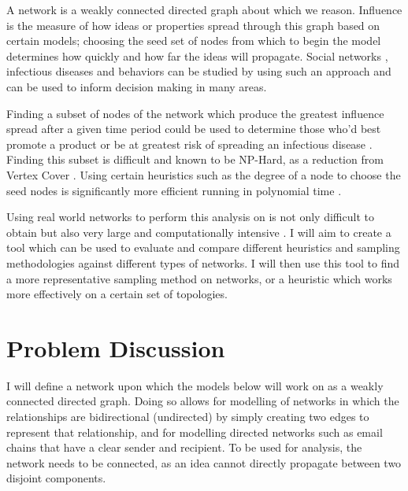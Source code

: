 \documentclass{article}
\begin{document}
A network is a weakly connected directed graph about which we reason.
Influence is the measure of how ideas or properties spread through this graph based on certain models;
choosing the seed set of nodes from which to begin the model determines how quickly and how far the ideas will propagate.
Social networks \cite{yang2019influence}, infectious diseases and behaviors \cite{archbold2024cvd} can be studied by using such an approach and can be used to inform decision making in many areas.

Finding a subset of nodes of the network which produce the greatest influence spread after a given time period could be used to determine those who'd best promote a product or be at greatest risk of spreading an infectious disease \cite{archbold2024cvd}.
Finding this subset is difficult and known to be NP-Hard, as a reduction from Vertex Cover \cite{kempe2005influential}.
Using certain heuristics such as the degree of a node to choose the seed nodes is significantly more efficient running in polynomial time \cite{chen2009efficient}.

Using real world networks to perform this analysis on is not only difficult to obtain but also very large and computationally intensive \cite{Wang2011UnderstandingGS}.
I will aim to create a tool which can be used to evaluate and compare different heuristics and sampling methodologies against different types of networks.
I will then use this tool to find a more representative sampling method on networks, or a heuristic which works more effectively on a certain set of topologies.

\section{Problem Discussion} \label{probDiscussion}

I will define a network upon which the models below will work on as a weakly connected directed graph.
Doing so allows for modelling of networks in which the relationships are bidirectional (undirected) by simply creating two edges to represent that relationship, and for modelling directed networks such as email chains that have a clear sender and recipient.
To be used for analysis, the network needs to be connected, as an idea cannot directly propagate between two disjoint components.
\end{document}
